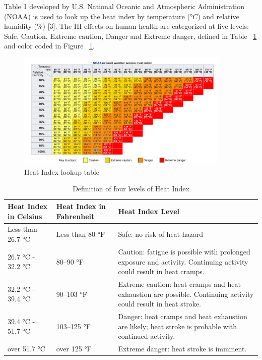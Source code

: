 Table 1 developed by U.S. National Oceanic and Atmospheric Administration (NOAA) is used to look up the heat index by temperature ($°C$) and relative humidity (\%) [3]. The HI effects on human health are categorized at five levels: Safe, Caution, Extreme caution, Danger and Extreme danger, defined in Table ~\ref{table:heat-index-chart} and color coded in Figure ~\ref{fig:heat-index-lookup-table}.

\begin{figure}[hbtp] 
\centering
\includegraphics[width=0.9\textwidth, height=0.9\textheight, keepaspectratio=true]{media/heat_index_chart.png}
\caption{Heat Index lookup table \protect \label{fig:heat-index-lookup-table}}
\end{figure}

\begin{table}
\centering
\caption{Definition of four levels of Heat Index \label{table:heat-index-chart}} \tabularnewline
\begin{tabular}{ |p{1in}|p{1in}|p{2in}|  }
\hline
    \textbf{Heat Index in Celsius} & \textbf{Heat Index in Fahrenheit} & \textbf{Heat Index Level} \\ \hline 
    Less than 26.7 °C & Less than 80 °F & Safe: no risk of heat hazard \\ \hline
    26.7 °C - 32.2 °C & 80–90 °F & Caution: fatigue is possible with prolonged exposure and activity. Continuing activity could result in heat cramps. \\ \hline
    32.2 °C - 39.4 °C & 90–103 °F & Extreme caution: heat cramps and heat exhaustion are possible. Continuing activity could result in heat stroke. \\ \hline
    39.4 °C - 51.7 °C & 103–125 °F & Danger: heat cramps and heat exhaustion are likely; heat stroke is probable with continued activity. \\ \hline
    over 51.7 °C & over 125 °F & Extreme danger: heat stroke is imminent. \\ \hline
\end{tabular}
\end{table}


